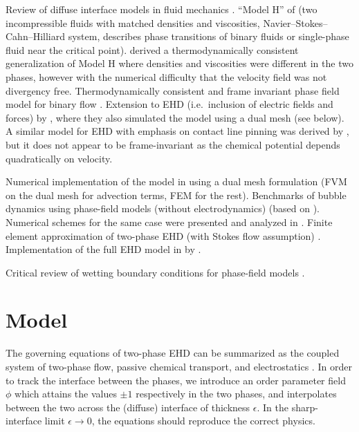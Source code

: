 \documentclass[preprint,pre,superscriptaddress,a4paper]{revtex4-1}
\begin{document}
Review of diffuse interface models in fluid mechanics \cite{anderson1998}.
``Model H'' of \citet{hohenberg1977} (two incompressible fluids with matched densities and viscosities, Navier--Stokes--Cahn--Hilliard system, describes phase transitions of binary fluids or single-phase fluid near the critical point).
\citet{lowengrub1998} derived a thermodynamically consistent generalization of Model H where densities and viscosities were different in the two phases, however with the numerical difficulty that the velocity field was not divergency free.
Thermodynamically consistent and frame invariant phase field model for binary flow \cite{abels2012}.
Extension to EHD (i.e.~inclusion of electric fields and forces) by \citet{campillo-funollet2012}, where they also simulated the model using a dual mesh (see below).
A similar model for EHD with emphasis on contact line pinning was derived by \citet{nochetto2014}, but it does not appear to be frame-invariant as the chemical potential depends quadratically on velocity.

Numerical implementation of the model in \cite{abels2012} using a dual mesh formulation (FVM on the dual mesh for advection terms, FEM for the rest).
Benchmarks of bubble dynamics using phase-field models (without electrodynamics) \cite{aland2012} (based on \cite{hysing2009}).
Numerical schemes for the same case were presented and analyzed in \cite{guillen-gonzalez2014,grun2016}.
Finite element approximation of two-phase EHD (with Stokes flow assumption) \cite{nurnberg2017}.
Implementation of the full EHD model in \cite{campillo-funollet2012} by \cite{metzger2015}.

Critical review of wetting boundary conditions for phase-field models \cite{huang2015}.

\section{Model}
The governing equations of two-phase EHD can be summarized as the coupled system of two-phase flow, passive chemical transport, and electrostatics \cite{campillo-funollet2012}.
In order to track the interface between the phases, we introduce an order parameter field $\phi$ which attains the values $\pm 1$ respectively in the two phases, and interpolates between the two across the (diffuse) interface of thickness $\epsilon$.
In the sharp-interface limit $\epsilon \to 0$, the equations should reproduce the correct physics.
\end{document}

